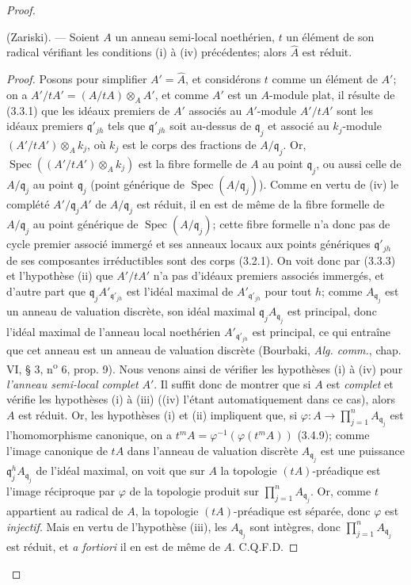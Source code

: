 \begin{proof}
\begin{lemma}[7.6.4.1]
\label{IV.2.s7.6.4.1-fr}
(Zariski). --- Soient $A$ un anneau semi-local noethérien, $t$ un élément de
son radical vérifiant les conditions \textup{(i)} à \textup{(iv)} précédentes; alors
$\widehat A$ est réduit.
\end{lemma}

\begin{proof}
Posons pour simplifier $A'=\widehat A$, et considérons $t$ comme un élément de
$A'$; on a $A'/tA'=(A/tA)\otimes_AA'$, et comme $A'$ est un $A$-module plat,
il résulte de (3.3.1) que les idéaux premiers de $A'$ associés au $A'$-module
$A'/tA'$ sont les idéaux premiers $\mathfrak q'_{jh}$ tels que
$\mathfrak q'_{jh}$ soit au-dessus de $\mathfrak q_j$ et associé au
$k_j$-module $(A'/tA')\otimes_Ak_j$, où $k_j$ est le corps des fractions de
$A/\mathfrak q_j$. Or,
$\operatorname{Spec}((A'/tA')\otimes_Ak_j)$ est la fibre formelle de $A$ au
point $\mathfrak q_j$, ou aussi celle de $A/\mathfrak q_j$ au point
$\mathfrak q_j$ (point générique de
$\operatorname{Spec}(A/\mathfrak q_j)$). Comme en vertu de (iv) le complété
$A'/\mathfrak q_jA'$ de $A/\mathfrak q_j$ est réduit, il en est de même de la
fibre formelle de $A/\mathfrak q_j$ au point générique de
$\operatorname{Spec}(A/\mathfrak q_j)$; cette fibre formelle n'a donc pas de
cycle premier associé immergé et ses anneaux locaux aux points génériques
$\mathfrak q'_{jh}$ de ses composantes irréductibles sont des corps (3.2.1).
On voit donc par (3.3.3) et l'hypothèse (ii) que $A'/tA'$ n'a pas d'idéaux
premiers associés immergés, et d'autre part que
$\mathfrak q_jA'_{\mathfrak q'_{jh}}$ est l'idéal maximal de
$A'_{\mathfrak q'_{jh}}$ pour tout $h$; comme $A_{\mathfrak q_j}$ est un
anneau de valuation discrète, son idéal maximal
$\mathfrak q_jA_{\mathfrak q_j}$ est principal, donc l'idéal maximal de
l'anneau local noethérien $A'_{\mathfrak q'_{jh}}$ est principal, ce qui
entraîne que cet anneau est un anneau de valuation discrète (Bourbaki,
\emph{Alg. comm.}, chap. VI, § 3, n\textsuperscript{o} 6, prop. 9). Nous venons
ainsi de vérifier les hypothèses (i) à (iv) pour \emph{l'anneau semi-local complet} $A'$.
Il suffit donc de montrer que si $A$ est \emph{complet} et vérifie les hypothèses (i)
à (iii) ((iv) l'étant automatiquement dans ce cas), alors $A$ est réduit. Or,
les hypothèses (i) et (ii) impliquent que, si
$\varphi:A\longrightarrow\prod_{j=1}^nA_{\mathfrak q_j}$
est l'homomorphisme canonique, on a
$t^mA=\varphi^{-1}(\varphi(t^mA))$ (3.4.9); comme l'image canonique de $tA$
dans l'anneau de valuation discrète $A_{\mathfrak q_j}$ est une puissance
$\mathfrak q_j^hA_{\mathfrak q_j}$ de l'idéal maximal, on voit que sur $A$ la
topologie $(tA)$-préadique est l'image réciproque par $\varphi$ de la topologie
produit sur $\prod_{j=1}^nA_{\mathfrak q_j}$. Or, comme $t$ appartient au
radical de $A$, la topologie $(tA)$-préadique est séparée, donc $\varphi$ est
\emph{injectif}. Mais en vertu de l'hypothèse (iii), les $A_{\mathfrak q_j}$ sont
intègres, donc $\prod_{j=1}^nA_{\mathfrak q_j}$ est réduit, et \emph{a fortiori} il en
est de même de $A$. C.Q.F.D.
\end{proof}
\end{proof}

